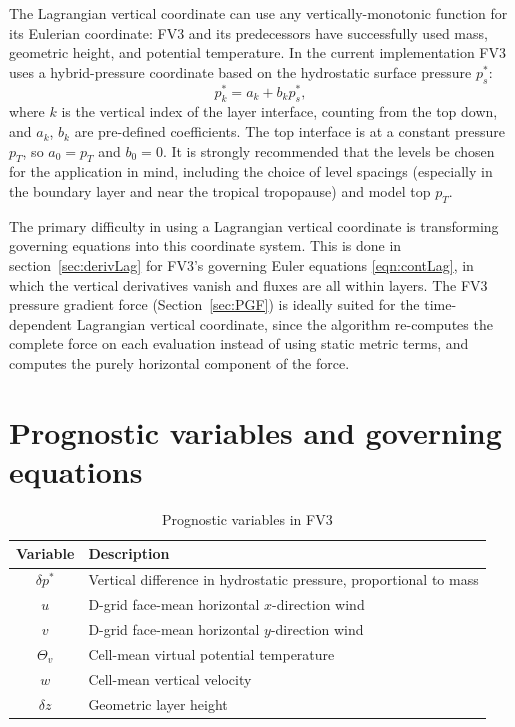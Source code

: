 \documentclass[10pt,letterpaper,margin=1in]{memoir}
\begin{document}
The Lagrangian vertical coordinate can use any vertically-monotonic function for its Eulerian coordinate: FV3 and its predecessors have successfully used mass, geometric height, and potential temperature. In the current implementation FV3 uses a hybrid-pressure coordinate based on the hydrostatic surface pressure $p^*_s$:
\begin{equation}
p^*_k = a_k + b_k p^*_s,
\end{equation}
where $k$ is the vertical index of the layer interface, counting from the top down, and $a_k$, $b_k$ are pre-defined coefficients. The top interface is at a constant pressure $p_T$, so $a_0 = p_T$ and $b_0 = 0$. 
It is strongly recommended that the levels be chosen for the application in mind, including the choice of level spacings  (especially in the boundary layer and near the tropical tropopause) and model top $p_T$. 

The primary difficulty in using a Lagrangian vertical coordinate is transforming governing equations into this coordinate system. This is done in section~\ref{sec:derivLag} for FV3's governing Euler equations \eqref{eqn:contLag}, in which the vertical derivatives vanish and fluxes are all within layers.
The FV3 pressure gradient force (Section~\ref{sec:PGF}) is ideally suited for the time-dependent Lagrangian vertical coordinate, since the algorithm re-computes the complete force on each evaluation instead of using static metric terms, and computes the purely horizontal component of the force.



\section{Prognostic variables and governing equations}

\begin{table}[t]
\begin{center}
\caption{Prognostic variables in FV3}
\begin{tabular}{cl}
Variable & Description \\ \hline
$\delta p^*$ & Vertical difference in hydrostatic pressure, proportional to mass \\
$u$ & D-grid face-mean horizontal $x$-direction wind \\
$v$ & D-grid face-mean horizontal $y$-direction wind \\
$\Theta_v$ & Cell-mean virtual potential temperature \\
$w$ & Cell-mean vertical velocity \\
$\delta z$ & Geometric layer height
\end{tabular} 
\end{center}
\label{table:variables}
\end{table}
\end{document}
